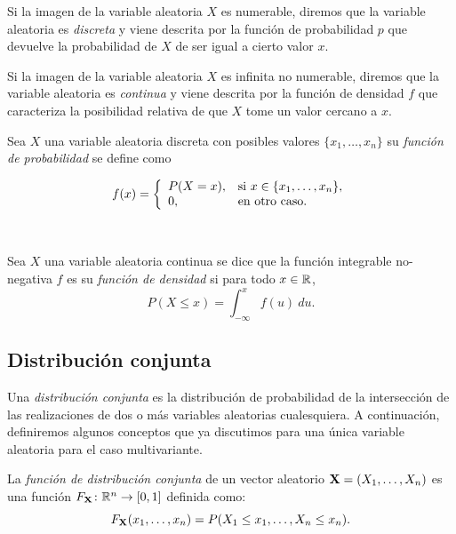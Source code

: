 \documentclass[oneside,openright,titlepage,numbers=noenddot,openany,headinclude,footinclude=true,
cleardoublepage=empty,abstractoff,BCOR=5mm,paper=a4,fontsize=12pt,main=spanish]{scrreprt}
\begin{document}
Si la imagen de la variable aleatoria $X$ es numerable, diremos que la variable aleatoria es \textit{discreta} y viene descrita por la función de probabilidad $p$ que devuelve la probabilidad de $X$ de ser igual a cierto valor $x$. 

Si la imagen de la variable aleatoria $X$ es infinita no numerable, diremos que la variable aleatoria es \textit{continua} y viene descrita por la función de densidad $f$ que caracteriza la posibilidad relativa de que $X$ tome un valor cercano a $x$.\\

\begin{definition}
Sea $X$ una variable aleatoria discreta con posibles valores $\{x_1,\dots,x_n\}$ su \textit{función de probabilidad} se define como 

$$f(x)= \left \{
\begin{array}{l l}
P(X=x), & \mbox{si } x\in \{x_1,\dots,x_n\}, \\
0, & \mbox{en otro caso}.
\end{array}
\right.$$
\end{definition}\

\begin{definition}
Sea $X$ una variable aleatoria continua se dice que la función integrable no-negativa $f$ es su \textit{función de densidad} si para todo $x \in \mathbb{R}$, $$P(X\leq x)=\int_{-\infty}^x f(u) \ du.$$
\end{definition}

\subsection{Distribución conjunta}

Una \textit{distribución conjunta} es la distribución de probabilidad de la intersección de las realizaciones de dos o más variables aleatorias cualesquiera. A continuación, definiremos algunos conceptos que ya discutimos para una única variable aleatoria para el caso multivariante.\\

\begin{definition}
La \textit{función de distribución conjunta} de un vector aleatorio $\textbf{X}=(X_1,\dots,X_n)$ es una función $F_{\textbf{X}}\colon \mathbb{R}^n \to [0,1]$ definida como: $$F_{\textbf{X}}(x_1,\dots,x_n)=P(X_1\leq x_1,\dots,X_n\leq x_n).$$
\end{definition}\
\end{document}
